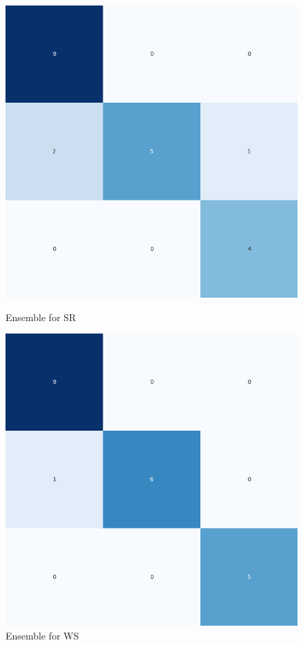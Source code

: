 \begin{figure}[H]
    \centering
    \begin{minipage}[b]{0.45\textwidth}
        \includegraphics[width=\textwidth]{./class_all_section/ensemble_plots/ensemble_confusion_matrix_SR.png}
        \caption{Ensemble for SR}
        \label{fig:ensemble_sr}
    \end{minipage}
    \hfill
    \begin{minipage}[b]{0.45\textwidth}
        \includegraphics[width=\textwidth]{./class_all_section/ensemble_plots/ensemble_confusion_matrix_WS.png}
        \caption{Ensemble for WS}
        \label{fig:ensemble_ws}
    \end{minipage}
\end{figure}

